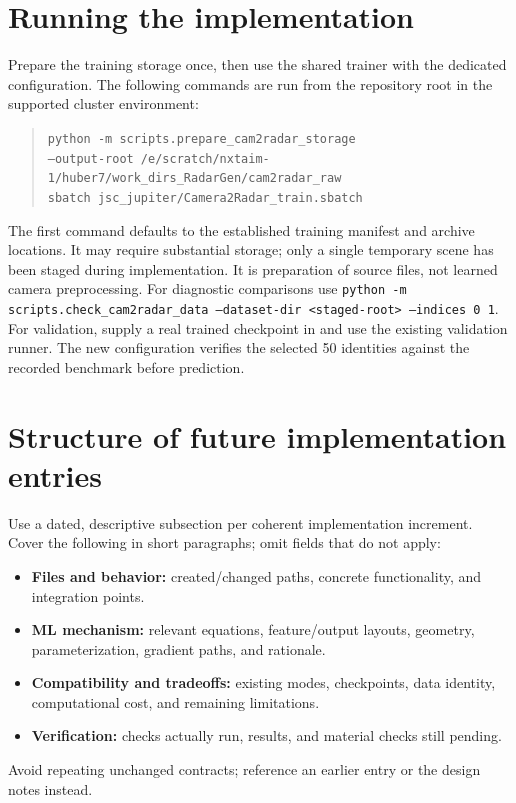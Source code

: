 \documentclass[11pt,a4paper]{article}
\begin{document}
\section{Running the implementation}
Prepare the training storage once, then use the shared trainer with the dedicated configuration. The following commands are run from the repository root in the supported cluster environment:
\begin{quote}\small
\texttt{python -m scripts.prepare\_cam2radar\_storage}\\
\texttt{\quad --output-root /e/scratch/nxtaim-1/huber7/work\_dirs\_RadarGen/cam2radar\_raw}\\[3pt]
\texttt{sbatch jsc\_jupiter/Camera2Radar\_train.sbatch}
\end{quote}
The first command defaults to the established training manifest and archive locations. It may require substantial storage; only a single temporary scene has been staged during implementation. It is preparation of source files, not learned camera preprocessing. For diagnostic comparisons use \texttt{python -m scripts.check\_cam2radar\_data --dataset-dir <staged-root> --indices 0 1}. For validation, supply a real trained checkpoint in  and use the existing validation runner. The new configuration verifies the selected 50 identities against the recorded benchmark before prediction.

\section{Structure of future implementation entries}
Use a dated, descriptive subsection per coherent implementation increment. Cover the following in short paragraphs; omit fields that do not apply:
\begin{itemize}[nosep]
\item \textbf{Files and behavior:} created/changed paths, concrete functionality, and integration points.
\item \textbf{ML mechanism:} relevant equations, feature/output layouts, geometry, parameterization, gradient paths, and rationale.
\item \textbf{Compatibility and tradeoffs:} existing modes, checkpoints, data identity, computational cost, and remaining limitations.
\item \textbf{Verification:} checks actually run, results, and material checks still pending.
\end{itemize}
Avoid repeating unchanged contracts; reference an earlier entry or the design notes instead.
\end{document}
